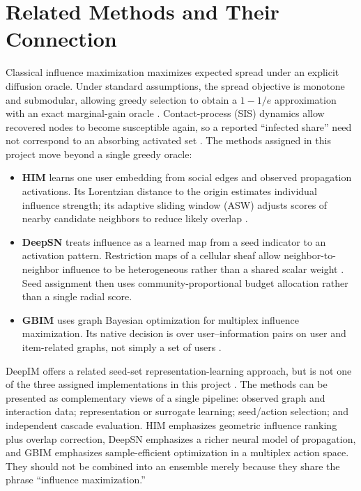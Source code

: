 \documentclass[10pt,twocolumn]{article}
\begin{document}
\section{Related Methods and Their Connection}
Classical influence maximization maximizes expected spread under an explicit diffusion oracle. Under standard assumptions, the spread objective is monotone and submodular, allowing greedy selection to obtain a $1-1/e$ approximation with an exact marginal-gain oracle \cite{kempe}. Contact-process (SIS) dynamics allow recovered nodes to become susceptible again, so a reported ``infected share'' need not correspond to an absorbing activated set \cite{pastor}. The methods assigned in this project move beyond a single greedy oracle:
\begin{itemize}[leftmargin=1.2em,itemsep=0.1em]
  \item \textbf{HIM} learns one user embedding from social edges and observed propagation activations. Its Lorentzian distance to the origin estimates individual influence strength; its adaptive sliding window (ASW) adjusts scores of nearby candidate neighbors to reduce likely overlap \cite{him}.
  \item \textbf{DeepSN} treats influence as a learned map from a seed indicator to an activation pattern. Restriction maps of a cellular sheaf allow neighbor-to-neighbor influence to be heterogeneous rather than a shared scalar weight \cite{hansen,bodnar,deepsn}. Seed assignment then uses community-proportional budget allocation rather than a single radial score.
  \item \textbf{GBIM} uses graph Bayesian optimization for multiplex influence maximization. Its native decision is over user--information pairs on user and item-related graphs, not simply a set of users \cite{gbim}.
\end{itemize}
DeepIM offers a related seed-set representation-learning approach, but is not one of the three assigned implementations in this project \cite{deepim}. The methods can be presented as complementary views of a single pipeline: observed graph and interaction data; representation or surrogate learning; seed/action selection; and independent cascade evaluation. HIM emphasizes geometric influence ranking plus overlap correction, DeepSN emphasizes a richer neural model of propagation, and GBIM emphasizes sample-efficient optimization in a multiplex action space. They should not be combined into an ensemble merely because they share the phrase ``influence maximization.''
\end{document}
